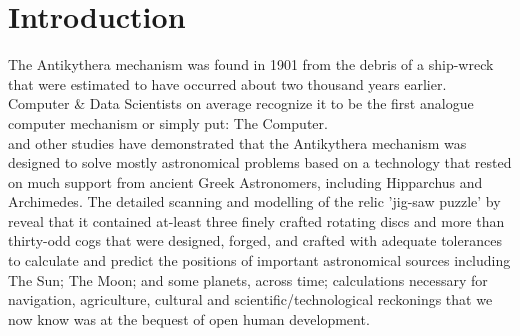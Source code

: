 \documentclass[final,5p,times,twocolumn,authoryear]{elsarticle}
\begin{document}

    

\section{Introduction}
\label{sec:intro}
%
 The Antikythera mechanism was found in 1901 from the debris of a ship-wreck that were estimated to have occurred about two thousand years earlier. Computer \& Data Scientists on average recognize it to be the first analogue computer mechanism or simply put: The Computer.\\ \citet{Freeth2021} and other studies have demonstrated that the Antikythera mechanism was designed to solve mostly astronomical problems based on a technology that rested on much support from ancient Greek Astronomers, including Hipparchus and Archimedes. The detailed scanning and modelling of the relic 'jig-saw puzzle' by \citet{Freeth2021} reveal that it contained at-least three finely crafted rotating discs and more than thirty-odd cogs that were designed, forged, and crafted with adequate tolerances to calculate and predict the positions of important astronomical sources including The Sun; The Moon; and some planets, across time; calculations necessary for navigation, agriculture, cultural and scientific/technological reckonings that we now know was at the bequest of open human development.
 
\end{document}
